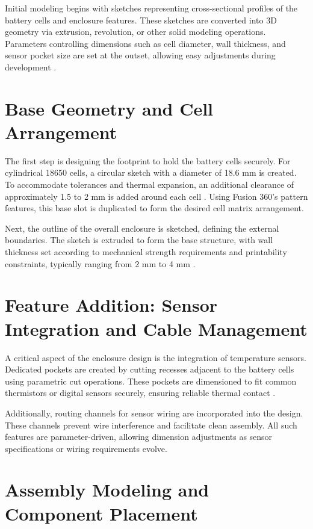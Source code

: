 Initial modeling begins with sketches representing cross-sectional profiles of the battery cells and enclosure features. These sketches are converted into 3D geometry via extrusion, revolution, or other solid modeling operations. Parameters controlling dimensions such as cell diameter, wall thickness, and sensor pocket size are set at the outset, allowing easy adjustments during development \cite{gebhardt2016}.

\section{Base Geometry and Cell Arrangement}

The first step is designing the footprint to hold the battery cells securely. For cylindrical 18650 cells, a circular sketch with a diameter of 18.6 mm is created. To accommodate tolerances and thermal expansion, an additional clearance of approximately 1.5 to 2 mm is added around each cell \cite{pistoia2018}. Using Fusion 360’s pattern features, this base slot is duplicated to form the desired cell matrix arrangement.

Next, the outline of the overall enclosure is sketched, defining the external boundaries. The sketch is extruded to form the base structure, with wall thickness set according to mechanical strength requirements and printability constraints, typically ranging from 2 mm to 4 mm \cite{gebhardt2016}.

\section{Feature Addition: Sensor Integration and Cable Management}

A critical aspect of the enclosure design is the integration of temperature sensors. Dedicated pockets are created by cutting recesses adjacent to the battery cells using parametric cut operations. These pockets are dimensioned to fit common thermistors or digital sensors securely, ensuring reliable thermal contact \cite{anderson2020}.

Additionally, routing channels for sensor wiring are incorporated into the design. These channels prevent wire interference and facilitate clean assembly. All such features are parameter-driven, allowing dimension adjustments as sensor specifications or wiring requirements evolve.

\section{Assembly Modeling and Component Placement}

